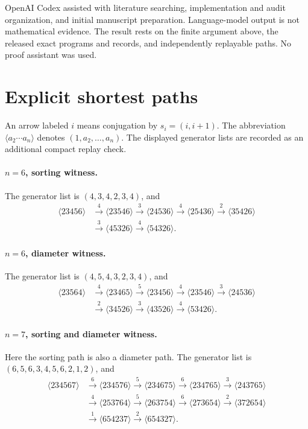 \documentclass[11pt]{article}
\newcommand{\cyc}[1]{\langle #1\rangle}
\begin{document}
OpenAI Codex assisted with literature searching, implementation and audit
organization, and initial manuscript preparation.  Language-model output is
not mathematical evidence.  The result rests on the finite argument above,
the released exact programs and records, and independently replayable paths.
No proof assistant was used.

\appendix
\section{Explicit shortest paths}\label{app:paths}

An arrow labeled $i$ means conjugation by $s_i=(i,i+1)$.  The abbreviation
$\cyc{a_2\cdots a_n}$ denotes $(1,a_2,\ldots,a_n)$.  The displayed generator
lists are recorded as an additional compact replay check.

\paragraph{$n=6$, sorting witness.}
The generator list is $(4,3,4,2,3,4)$, and
\[
\begin{aligned}
\cyc{23456}&\xrightarrow{4}\cyc{23546}\xrightarrow{3}\cyc{24536}
\xrightarrow{4}\cyc{25436}\xrightarrow{2}\cyc{35426}\\
&\xrightarrow{3}\cyc{45326}\xrightarrow{4}\cyc{54326}.
\end{aligned}
\]

\paragraph{$n=6$, diameter witness.}
The generator list is $(4,5,4,3,2,3,4)$, and
\[
\begin{aligned}
\cyc{23564}&\xrightarrow{4}\cyc{23465}\xrightarrow{5}\cyc{23456}
\xrightarrow{4}\cyc{23546}\xrightarrow{3}\cyc{24536}\\
&\xrightarrow{2}\cyc{34526}\xrightarrow{3}\cyc{43526}
\xrightarrow{4}\cyc{53426}.
\end{aligned}
\]

\paragraph{$n=7$, sorting and diameter witness.}
Here the sorting path is also a diameter path.  The generator list is
$(6,5,6,3,4,5,6,2,1,2)$, and
\[
\begin{aligned}
\cyc{234567}&\xrightarrow{6}\cyc{234576}\xrightarrow{5}\cyc{234675}
\xrightarrow{6}\cyc{234765}\xrightarrow{3}\cyc{243765}\\
&\xrightarrow{4}\cyc{253764}\xrightarrow{5}\cyc{263754}
\xrightarrow{6}\cyc{273654}\xrightarrow{2}\cyc{372654}\\
&\xrightarrow{1}\cyc{654237}\xrightarrow{2}\cyc{654327}.
\end{aligned}
\]
\end{document}
